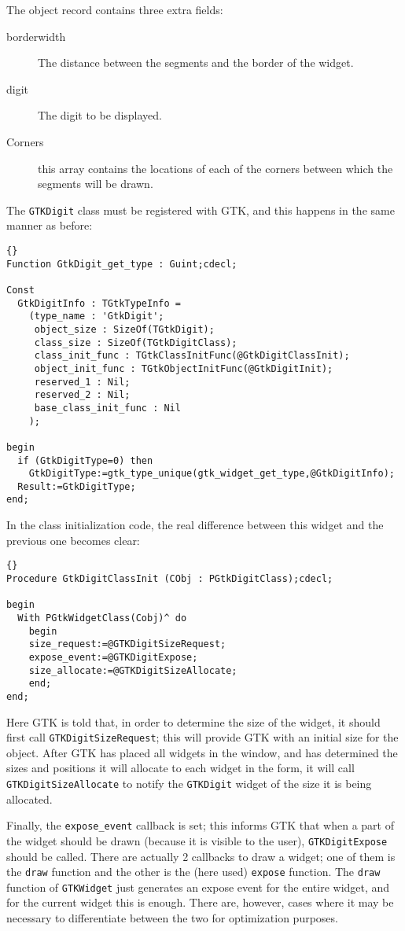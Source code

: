 \documentclass[10pt]{article}
\begin{document}
The object record contains three extra fields:
\begin{description}
\item[borderwidth] The distance between the segments and the border of 
the widget.
\item[digit] The digit to be displayed.
\item[Corners] this array contains the locations of each of the corners
between which the segments will be drawn.
\end{description}
The \lstinline|GTKDigit| class must be registered with GTK, and this happens
in the same manner as before:
\begin{lstlisting}{}
Function GtkDigit_get_type : Guint;cdecl;

Const 
  GtkDigitInfo : TGtkTypeInfo = 
    (type_name : 'GtkDigit';
     object_size : SizeOf(TGtkDigit);
     class_size : SizeOf(TGtkDigitClass);
     class_init_func : TGtkClassInitFunc(@GtkDigitClassInit);
     object_init_func : TGtkObjectInitFunc(@GtkDigitInit);
     reserved_1 : Nil;
     reserved_2 : Nil;
     base_class_init_func : Nil
    );

begin
  if (GtkDigitType=0) then
    GtkDigitType:=gtk_type_unique(gtk_widget_get_type,@GtkDigitInfo);
  Result:=GtkDigitType;  
end;
\end{lstlisting}
In the class initialization code, the real difference between this widget
and the previous one becomes clear:
\begin{lstlisting}{}
Procedure GtkDigitClassInit (CObj : PGtkDigitClass);cdecl;

begin
  With PGtkWidgetClass(Cobj)^ do 
    begin
    size_request:=@GTKDigitSizeRequest;
    expose_event:=@GTKDigitExpose;
    size_allocate:=@GTKDigitSizeAllocate;
    end;
end;
\end{lstlisting}
Here GTK is told that, in order to determine the size of the widget,
it should first call \lstinline|GTKDigitSizeRequest|; this will provide
GTK with an initial size for the object. After GTK has placed all widgets
in the window, and has determined the sizes and positions it will allocate 
to each widget in the form, it will call \lstinline|GTKDigitSizeAllocate| 
to notify the \lstinline|GTKDigit| widget of the size it is being allocated.

Finally, the \lstinline|expose_event| callback is set; this informs GTK that
when a part of the widget should be drawn (because it is visible to the
user), \lstinline|GTKDigitExpose| should be called. There are actually 2 
callbacks to draw a widget; one of them is
the \lstinline|draw| function and the other is the (here used) 
\lstinline|expose| function. The \lstinline|draw| function of 
\lstinline|GTKWidget| just generates an expose event for the entire widget,
and for the current widget this is enough. There are, however, cases where
it may be necessary to differentiate between the two for optimization
purposes.
\end{document}

